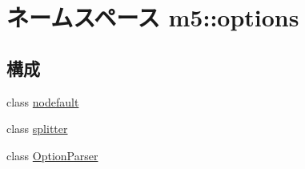 \hypertarget{namespacem5_1_1options}{
\section{ネームスペース m5::options}
\label{namespacem5_1_1options}
}
\subsection*{構成}
\begin{DoxyCompactItemize}
\item 
class \hyperlink{classm5_1_1options_1_1nodefault}{nodefault}
\item 
class \hyperlink{classm5_1_1options_1_1splitter}{splitter}
\item 
class \hyperlink{classm5_1_1options_1_1OptionParser}{OptionParser}
\end{DoxyCompactItemize}
